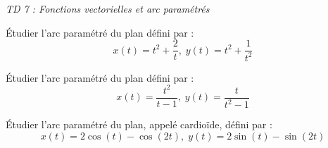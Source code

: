 \documentclass[a4paper,10pt]{report}
\begin{document}
\everymath{\displaystyle}


\begin{center}
\textit{{ {\huge TD 7 : Fonctions vectorielles et arc paramétrés}}}
\end{center}


\medskip

%

%
%
%
%
%
%
%
%
%
%

\begin{Exercice}{} Étudier l'arc paramétré du plan défini par :
$$ x(t) = t^2+ \dfrac{2}{t}, \; y(t) = t^2+\dfrac{1}{t^2} $$
\end{Exercice}

\begin{Exercice}{} Étudier l'arc paramétré du plan défini par :
$$ x(t) = \dfrac{t^2}{t-1}, \; y(t) = \dfrac{t}{t^2-1} $$
\end{Exercice}

\begin{Exercice}{} Étudier l'arc paramétré du plan, appelé cardioïde,  défini par :
$$ x(t) = 2 \cos(t) - \cos(2t), \; y(t) = 2 \sin(t) - \sin(2t) $$
\end{Exercice} 
\end{document}

